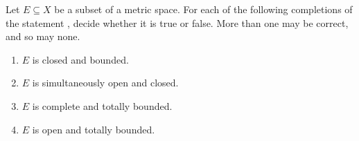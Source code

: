 \begin{exercise}
\label{ex:kobel_compactness_characterisation}
Let $E \subseteq X$ be a subset of a metric space. For each of the following completions of the
statement , decide whether it is true or false. More than one may be
correct, and so may none.
\begin{enumerate}[label=\textbf{(\alph*)}]
  \item $E$ is closed and bounded.
  \item $E$ is simultaneously open and closed.
  \item $E$ is complete and totally bounded.
  \item $E$ is open and totally bounded.
\end{enumerate}
\end{exercise}
